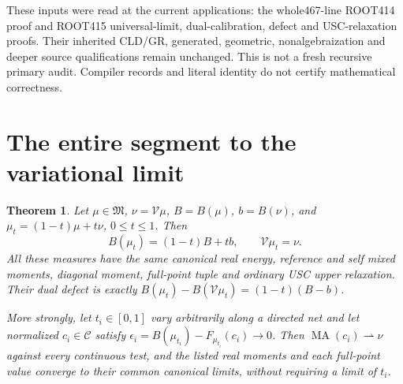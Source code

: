 \documentclass[11pt]{article}
\newtheorem{theorem}{Theorem}
\newcommand{\C}{\mathcal C}
\newcommand{\M}{\mathfrak M}
\newcommand{\MA}{\operatorname{MA}}
\newcommand{\V}{\mathcal V}
\begin{document}
These inputs were read at the current applications: the whole467-line
ROOT414 proof and ROOT415 universal-limit, dual-calibration, defect and
USC-relaxation proofs. Their inherited CLD/GR, generated, geometric,
nonalgebraization and deeper source qualifications remain unchanged.
This is not a fresh recursive primary audit. Compiler records and
literal identity do not certify mathematical correctness.

\section{The entire segment to the variational limit}
\begin{theorem}\label{ray}
Let $\mu\in\M$, $\nu=\V\mu$, $B=B(\mu)$, $b=B(\nu)$, and
$\mu_t=(1-t)\mu+t\nu$, $0\le t\le1$. Then
\[
 B(\mu_t)=(1-t)B+tb,\qquad \V\mu_t=\nu.
\]
All these measures have the same canonical real energy, reference and
self mixed moments, diagonal moment, full-point tuple and ordinary USC
upper relaxation. Their dual defect is exactly
$B(\mu_t)-B(\V\mu_t)=(1-t)(B-b)$.

More strongly, let $t_i\in[0,1]$ vary arbitrarily along a directed net
and let normalized $c_i\in\C$ satisfy
$\epsilon_i=B(\mu_{t_i})-F_{\mu_{t_i}}(c_i)\to0$.
Then $\MA(c_i)\rightharpoonup\nu$ against every continuous test,
and the listed real moments and each full-point value converge to
their common canonical limits, without requiring a limit of $t_i$.
\end{theorem}
\end{document}
